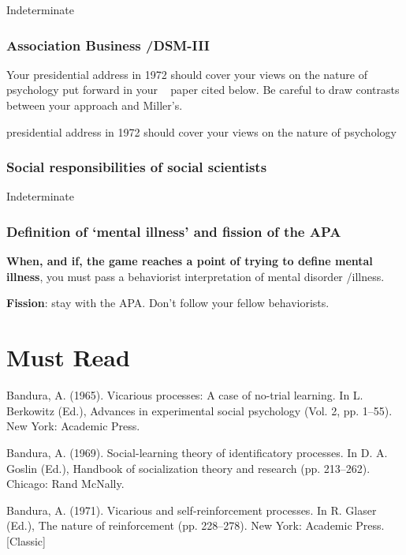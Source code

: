\begin{refsection}
Indeterminate

\subsubsection{Association Business \slash  DSM-III}
\label{associationbusinessdsm-iii}

Your presidential address in 1972 should cover your views on the nature of psychology put forward in your ~\citep{Bandura:1974kd} paper cited below. Be careful to draw contrasts between your approach and Miller's.

\begin{writingtask}[Bandura]\label{writingtask:bandura}
presidential address in 1972 should cover your views on the nature of psychology
\end{writingtask}

\subsubsection{Social responsibilities of social scientists}
\label{socialresponsibilitiesofsocialscientists}

Indeterminate

\subsubsection{Definition of ‘mental illness’ and fission of the APA}
\label{definitionof‘mentalillness’andfissionoftheapa}

\textbf{When, and if, the game reaches a point of trying to define mental illness}, you must pass a behaviorist interpretation of mental disorder \slash  illness.

\textbf{Fission}: stay with the APA. Don't follow your fellow behaviorists.

\section{Must Read}
\label{mustread}

Bandura, A. (1965). Vicarious processes: A case of no-trial learning. In L. Berkowitz (Ed.), Advances in experimental social psychology (Vol. 2, pp. 1--55). New York: Academic Press.

Bandura, A. (1969). Social-learning theory of identificatory processes. In D. A. Goslin (Ed.), Handbook of socialization theory and research (pp. 213--262). Chicago: Rand McNally.

Bandura, A. (1971). Vicarious and self-reinforcement processes. In R. Glaser (Ed.), The nature of reinforcement (pp. 228--278). New York: Academic Press. [Classic]


\end{refsection}

